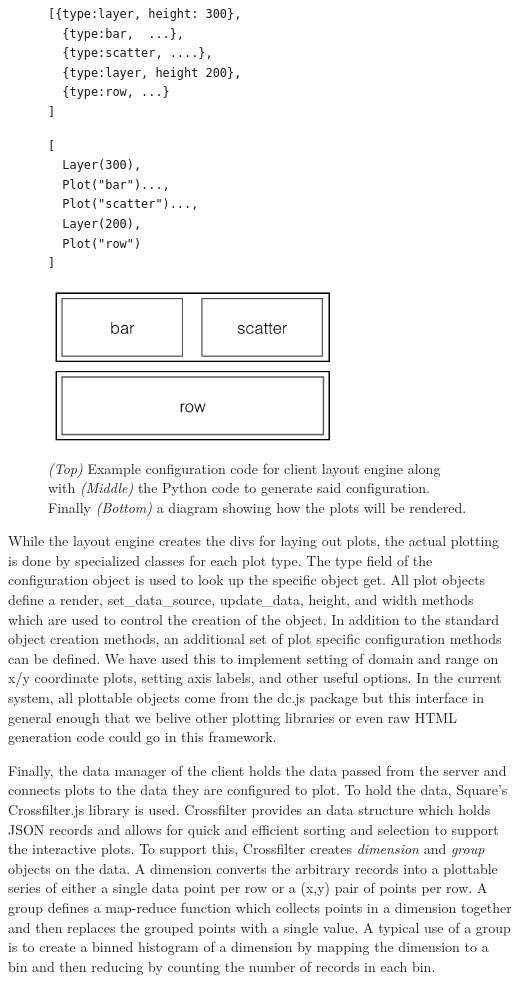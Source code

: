 \documentclass[letter,twocolumn]{article}
\begin{document}
\begin{figure}
\begin{lstlisting}
[{type:layer, height: 300}, 
  {type:bar,  ...},
  {type:scatter, ....},
  {type:layer, height 200},
  {type:row, ...}
]
\end{lstlisting}

\begin{lstlisting}
[
  Layer(300), 
  Plot("bar")..., 
  Plot("scatter")...,
  Layer(200), 
  Plot("row")
]
\end{lstlisting}
\includegraphics[width=3in]{figs/layout_example.png}
\caption{\emph{(Top)} Example configuration code for client layout engine along with \emph{(Middle)} the Python code to generate said configuration.  Finally \emph{(Bottom)} a diagram showing how the plots will be rendered.}\label{fig:layout}
\end{figure}

While the layout engine creates the divs for laying out plots, the actual plotting is done by specialized classes for each plot type.
The type field of the configuration object is used to look up the specific object get.
All plot objects define a render, set\_data\_source, update\_data, height, and width methods which are used to control the creation of the object.
In addition to the standard object creation methods, an additional set of plot specific configuration methods can be defined.
We have used this to implement setting of domain and range on x/y coordinate plots, setting axis labels, and other useful options.
In the current system, all plottable objects come from the dc.js package but this interface in general enough that we belive other plotting libraries or even raw HTML generation code could go in this framework.

Finally, the data manager of the client holds the data passed from the server and connects plots to the data they are configured to plot.
To hold the data, Square's Crossfilter.js\cite{crossfilter} library is used.
Crossfilter provides an data structure which holds JSON records and allows for quick and efficient sorting and selection to support the interactive plots.
To support this, Crossfilter creates \emph{dimension} and \emph{group} objects on the data.
A dimension converts the arbitrary records into a plottable series of either a single data point per row or a (x,y) pair of points per row.
A group defines a map-reduce function which collects points in a dimension together and then replaces the grouped points with a single value.
A typical use of a group is to create a binned histogram of a dimension by mapping the dimension to a bin and then reducing by counting the number of records in each bin.
\end{document}
